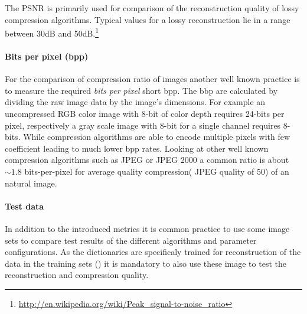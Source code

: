 The PSNR is primarily used for comparison of the reconstruction quality of
lossy compression algorithms. Typical values for a lossy reconstruction lie in
a range between 30dB and
50dB.\footnote{\url{http://en.wikipedia.org/wiki/Peak_signal-to-noise_ratio}}

\paragraph{Bits per pixel (bpp)} 
For the comparison of compression ratio of images another well known practice is
to measure the required \emph{bits per pixel} short bpp. The bbp are calculated
by dividing the raw image data by the image's dimensions. For example an
uncompressed RGB color image with 8-bit of color depth requires 24-bits per
pixel, respectively a gray scale image with 8-bit for a single channel requires
8-bits. While compression algorithms are able to encode multiple pixels with few
coefficient leading to much lower bpp rates.
Looking at other well known compression algorithms such as JPEG or
JPEG 2000 a common ratio is about $\sim1.8$ bits-per-pixel for average
quality compression( JPEG quality of 50) of an natural image. 


\paragraph{Test data}
In addition to the introduced metrics it is common practice to use some image
sets to compare test results of the different algorithms and parameter
configurations. As the dictionaries are specificaly trained for
reconstruction of the data in the training sets
() it is mandatory to also use
these image to test the reconstruction and
compression quality. 



